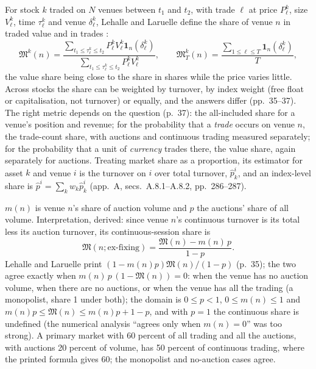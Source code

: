 \begin{qfmethod}\label{meth:venue-market-share}
 For stock $k$ traded on $N$ venues between $t_1$ and $t_2$, with trade $\ell$ at price $P^k_\ell$, size $V^k_\ell$, time $\tau^k_\ell$ and venue $\delta^k_\ell$, Lehalle and Laruelle define the share of venue $n$ in traded value and in trades \citep[chap.~1, sec.~1.1.1, eqs.~(1.1)--(1.2), pp.~34--35]{alpha-laruelle}:
\[ \mathfrak M^k(n)=\frac{\sum_{t_1\le\tau^k_\ell\le t_2}P^k_\ell V^k_\ell\mathbf 1_n(\delta^k_\ell)}{\sum_{t_1\le\tau^k_\ell\le t_2}P^k_\ell V^k_\ell},\qquad \mathfrak M^k_T(n)=\frac{\sum_{1\le\ell\le T}\mathbf 1_n(\delta^k_\ell)}{T}, \]
the value share being close to the share in shares while the price varies little. Across stocks the share can be weighted by turnover, by index weight (free float or capitalisation, not turnover) or equally, and the answers differ (pp.~35--37). The right metric depends on the question (p.~37): the all-included share for a venue's position and revenue; for the probability that a \emph{trade} occurs on venue $n$, the trade-count share, with auctions and continuous trading measured separately; for the probability that a unit of \emph{currency} trades there, the value share, again separately for auctions. Treating market share as a proportion, its estimator for asset $k$ and venue $i$ is the turnover on $i$ over total turnover, $\hat p^i_k$, and an index-level share is $\hat p^i=\sum_kw_k\hat p^i_k$ (app.~A, secs.~A.8.1--A.8.2, pp.~286--287).

 $m(n)$ is venue $n$'s share of auction volume and $p$ the auctions' share of all volume. Interpretation, derived: since venue $n$'s continuous turnover is its total less its auction turnover, its continuous-session share is
\[ \mathfrak M(n;\text{ex-fixing})=\frac{\mathfrak M(n)-m(n)\,p}{1-p}. \]
Lehalle and Laruelle print $(1-m(n)p)\mathfrak M(n)/(1-p)$ (p.~35); the two agree exactly when $m(n)\,p\,(1-\mathfrak M(n))=0$: when the venue has no auction volume, when there are no auctions, or when the venue has all the trading (a monopolist, share 1 under both); the domain is $0\le p<1$, $0\le m(n)\le1$ and $m(n)p\le\mathfrak M(n)\le m(n)p+1-p$, and with $p=1$ the continuous share is undefined (the numerical analysis ``agrees only when $m(n)=0$'' was too strong). A primary market with 60 percent of all trading and all the auctions, with auctions 20 percent of volume, has 50 percent of continuous trading, where the printed formula gives 60; the monopolist and no-auction cases agree.


\end{qfmethod}
